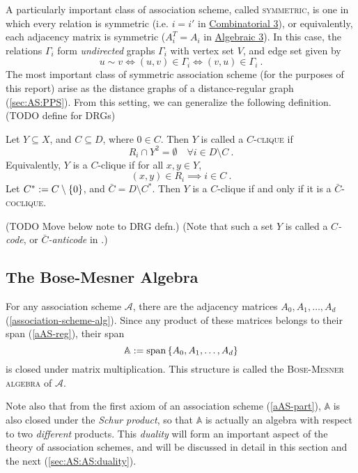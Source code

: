 \documentclass{report}
\newcommand{\AS}{\mathcal{A}}
\newcommand{\BMA}{\mathbb{A}}
\begin{document}
    A particularly important class of association scheme, called
    \textsc{symmetric}, is one in which every relation is symmetric (i.e. $i =
    i'$ in \hyperref[cAS-sym]{Combinatorial 3}), or equivalently, each adjacency
    matrix is symmetric ($A_i^T = A_i$ in \hyperref[aAS-sym]{Algebraic 3}).
    In this case, the relations $\Gamma_i$ form \textit{undirected} graphs $\Gamma_i$
    with vertex set $V$, and edge set given by
    $$
      u \sim v \iff (u, v) \in \Gamma_i \iff (v, u) \in \Gamma_i
      \ .
    $$
    The most important class of symmetric association scheme (for the purposes
    of this report) arise as the distance graphs of a distance-regular graph
    (\ref{sec:AS:PPS}).  From this setting, we can generalize the following
    definition.  (TODO define for DRGs)

    \begin{defn}
      \label{AS-clique}
      Let $Y \subseteq X$, and $C \subseteq D$, where $0 \in C$.
      Then $Y$ is called a \textsc{$C$-clique} if
      $$
        R_i \cap Y^2 = \emptyset \quad \forall i \in D \setminus C
        \ .
      $$
      Equivalently, $Y$ is a $C$-clique if for all $x, y \in Y$,
      $$
        (x, y) \in R_i \implies i \in C
        \ .
      $$
      Let $C^* := C \setminus \left\lbrace 0 \right\rbrace$, and $\bar{C} = D \setminus C^*$.
      Then $Y$ is a $C$-clique if and only if it is a
      \textsc{$\bar{C}$-coclique}.

      (TODO Move below note to DRG defn.)
      (Note that such a set $Y$ is called a \textit{$C$-code},
      or \textit{$\bar{C}$-anticode} in \cite{godsil}.)
    \end{defn}

    \subsection{The Bose-Mesner Algebra}\label{sec:AS:AS:BMA}
      For any association scheme $\AS$,
      there are the adjacency matrices
      $A_0, A_1, \ldots, A_d$ (\ref{association-scheme-alg}).
      Since any product of these matrices belongs to their span (\ref{aAS-reg}),
      their span
      \begin{equation}\label{BMA}
        \BMA := \Span\set{A_0, A_1, \ldots, A_d}
      \end{equation}
      is closed under matrix multiplication.  This structure is called the
      \textsc{Bose-Mesner algebra} of $\AS$.

      Note also that from the first axiom of an association scheme
      (\ref{aAS-part}), $\BMA$ is also closed under the \textit{Schur product},
      so that $\BMA$ is actually an algebra with respect to two
      \textit{different} products.
      This \textit{duality} will form an important aspect of the theory of
      association schemes, and will be discussed in detail in this section and
      the next (\ref{sec:AS:AS:duality}).
\end{document}
